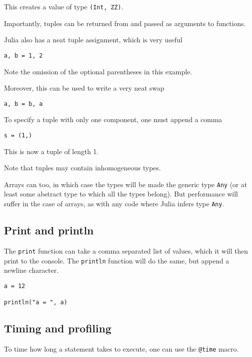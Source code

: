 \documentclass[a4paper,10pt]{article}
\newcommand{\code}{\lstinline}
\begin{document}
{This creates a value of type \code{(Int, ZZ)}.

Importantly, tuples can be returned from and passed as arguments to functions.

Julia also has a neat tuple assignment, which is very useful

\begin{lstlisting}
a, b = 1, 2
\end{lstlisting}

Note the omission of the optional parentheses in this example.

Moreover, this can be used to write a very neat swap

\begin{lstlisting}
a, b = b, a
\end{lstlisting}

To specify a tuple with only one component, one must append a comma

\begin{lstlisting}
s = (1,)
\end{lstlisting}

This is now a tuple of length 1.

Note that tuples may contain inhomogeneous types. 

Arrays can too, in which case the types will be made the generic type \code{Any} (or
at least some abstract type to which all the types belong). 
But performance will suffer in the case of arrays, as with any code where Julia infers
type \code{Any}.

\subsection{Print and println}

The \code{print} function can take a comma separated list of values, which it will
then print to the console. The \code{println} function will do the same, but append
a newline character.

\begin{lstlisting}
a = 12

println("a = ", a)
\end{lstlisting}

\subsection{Timing and profiling}

To time how long a statement takes to execute, one can use the \code{@time} macro.

}
\end{document}

